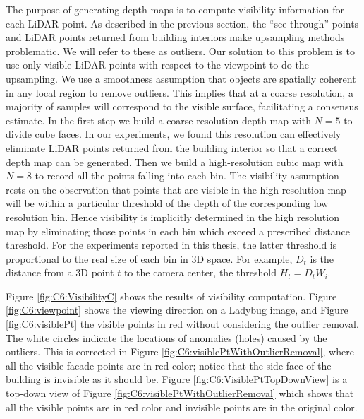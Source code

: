 The purpose of generating depth maps is to compute visibility information for each LiDAR point. As described in the previous section, the “see-through” points and LiDAR points returned from building interiors make upsampling methods problematic. We will refer to these as outliers. Our solution to this problem is to use only visible LiDAR points with respect to the viewpoint to do the upsampling. We use a smoothness assumption that objects are spatially coherent in any local region to remove outliers. This implies that at a coarse resolution, a majority of samples will correspond to the visible surface, facilitating a consensus estimate.
In the first step we build a coarse resolution depth map with $N=5$ to divide cube faces. In our experiments, we found this resolution can effectively eliminate LiDAR points returned from the building interior so that a correct depth map can be generated. Then we build a high-resolution cubic map with $N=8$ to record all the points falling into each bin. The visibility assumption rests on the observation that points that are visible in the high resolution map will be within a particular threshold of the depth of the corresponding low resolution bin. Hence visibility is implicitly determined in the high resolution map by eliminating those points in each bin which exceed a prescribed distance threshold. For the experiments reported in this thesis, the latter threshold is proportional to the real size of each bin in 3D space.
For example, $D_t$ is the distance from a 3D point $t$ to the camera 
center, the threshold $H_t = D_tW_i$. 

Figure \ref{fig:C6:VisibilityC} shows the results of visibility computation. Figure \ref{fig:C6:viewpoint} shows the viewing direction on a Ladybug image, and Figure \ref{fig:C6:visiblePt} the visible points in red without considering the outlier removal. The white circles indicate the locations of anomalies (holes) caused by the outliers. This is corrected in Figure \ref{fig:C6:visiblePtWithOutlierRemoval}, where all the visible facade points are in red color; notice that the side face of the building is invisible as it should be. Figure \ref{fig:C6:VisiblePtTopDownView} is a top-down view of Figure \ref{fig:C6:visiblePtWithOutlierRemoval} which shows that
all the visible points are in red color and invisible points are in the original color. 

